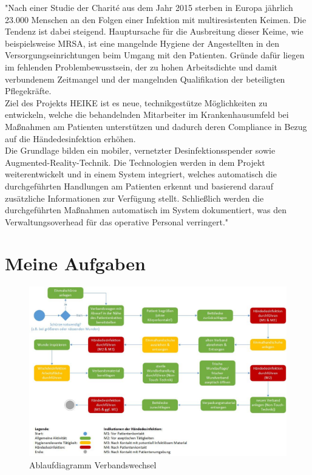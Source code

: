 "Nach einer Studie der Charité aus dem Jahr 2015 sterben in Europa jährlich 23.000 Menschen an den Folgen einer Infektion mit multiresistenten Keimen. Die Tendenz ist dabei steigend. Hauptursache für die Ausbreitung dieser Keime, wie beispielsweise MRSA, ist eine mangelnde Hygiene der Angestellten in den Versorgungseinrichtungen beim Umgang mit den Patienten. Gründe dafür liegen im fehlenden Problembewusstsein, der zu hohen Arbeitsdichte und damit verbundenem Zeitmangel und der mangelnden Qualifikation der beteiligten Pflegekräfte.
\\

Ziel des Projekts HEIKE ist es neue, technikgestütze Möglichkeiten zu entwickeln, welche die behandelnden Mitarbeiter im Krankenhausumfeld bei Maßnahmen am Patienten unterstützen und dadurch deren Compliance in Bezug auf die Händedesinfektion erhöhen.
\\

Die Grundlage bilden ein mobiler, vernetzter Desinfektionsspender sowie Augmented-Reality-Technik. Die Technologien werden in dem Projekt weiterentwickelt und in einem System integriert, welches automatisch die durchgeführten Handlungen am Patienten erkennt und basierend darauf zusätzliche Informationen zur Verfügung stellt. Schließlich werden die durchgeführten Maßnahmen automatisch im System dokumentiert, was den Verwaltungsoverhead für das operative Personal verringert." \cite{FZI_Projekt}


\newpage
\section{Meine Aufgaben}
\label{sec:Aufgaben}
\begin{figure}[htb]
  \centering  
  \includegraphics[scale=0.5]{img/Ablaufdiagramm_Verbandswechsel.jpg}
  \caption{Ablaufdiagramm Verbandswechsel \cite{AblauffdiagrammVerbandswechsel}}
  \label{fig:Ablaufdiagramm Verbandswechsel}
\end{figure}

